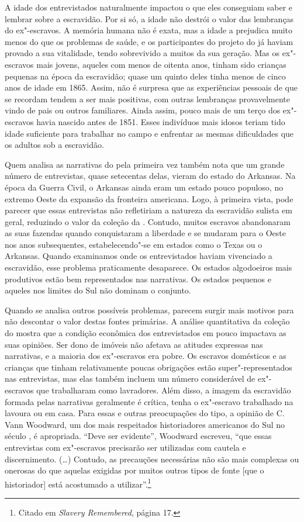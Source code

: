 A idade dos entrevistados naturalmente impactou o que eles conseguiam
saber e lembrar sobre a escravidão. Por si só, a idade não destrói o
valor das lembranças do ex"-escravos. A memória humana não é exata, mas a
idade a prejudica muito menos do que os problemas de saúde, e os
participantes do projeto do  já haviam provado a sua vitalidade,
tendo sobrevivido a muitos da sua geração. Mas os ex"-escravos mais
jovens, aqueles com menos de oitenta anos, tinham sido crianças pequenas
na época da escravidão; quase um quinto deles tinha menos de cinco anos
de idade em 1865. Assim, não é surpresa que as experiências pessoais de
que se recordam tendem a ser mais positivas, com outras lembranças
provavelmente vindo de pais ou outros familiares. Ainda assim, pouco
mais de um terço dos ex"-escravos havia nascido antes de 1851. Esses
indivíduos mais idosos teriam tido idade suficiente para trabalhar no
campo e enfrentar as mesmas dificuldades que os adultos sob a
escravidão.

Quem analisa as narrativas do  pela primeira vez também nota que um
grande número de entrevistas, quase setecentas delas, vieram do estado
do Arkansas. Na época da Guerra Civil, o Arkansas ainda eram um estado
pouco populoso, no extremo Oeste da expansão da fronteira americana.
Logo, à primeira vista, pode parecer que essas entrevistas não
refletiriam a natureza da escravidão sulista em geral, reduzindo o valor
da coleção da . Contudo, muitos escravos abandonaram as suas fazendas
quando conquistaram a liberdade e se mudaram para o Oeste nos anos
subsequentes, estabelecendo"-se em estados como o Texas ou o Arkansas.
Quando examinamos onde os entrevistados haviam vivenciado a escravidão,
esse problema praticamente desaparece. Os estados algodoeiros mais
produtivos estão bem representados nas narrativas. Os estados pequenos e
aqueles nos limites do Sul não dominam o conjunto.

Quando se analisa outros possíveis problemas, parecem surgir mais
motivos para não descontar o valor destas fontes primárias. A análise
quantitativa da coleção do  mostra que a condição econômica dos
entrevistados em pouco impactava as suas opiniões. Ser dono de imóveis
não afetava as atitudes expressas nas narrativas, e a maioria dos
ex"-escravos era pobre. Os escravos domésticos e as crianças que tinham
relativamente poucas obrigações estão super"-representados nas
entrevistas, mas elas também incluem um número considerável de
ex"-escravos que trabalharam como lavradores. Além disso, a imagem da
escravidão formada pelas narrativas geralmente é crítica, tenha o
ex"-escravo trabalhado na lavoura ou em casa. Para essas e outras
preocupações do tipo, a opinião de C. Vann Woodward, um dos mais
respeitados historiadores americanos do Sul no século , é apropriada.
``Deve ser evidente'', Woodward escreveu, ``que essas entrevistas com
ex"-escravos precisarão ser utilizadas com cautela e discernimento.
(\ldots{}) Contudo, as precauções necessárias não são mais complexas ou
onerosas do que aquelas exigidas por muitos outros tipos de fonte {[}que
o historiador{]} está acostumado a utilizar''.\footnote{Citado em
  \emph{Slavery Remembered}, página 17.}

